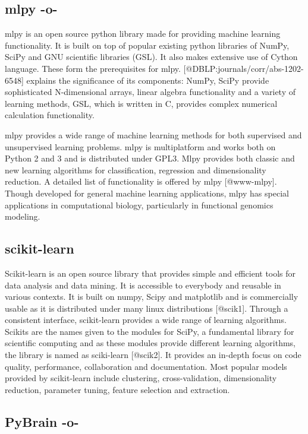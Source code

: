 \subsection{mlpy -o-}
    
mlpy is an open source python library made for providing machine
learning functionality. It is built on top of popular existing python
libraries of NumPy, SciPy and GNU scientific libraries (GSL). It also
makes extensive use of Cython language. These form the prerequisites
for mlpy. [@DBLP:journals/corr/abs-1202-6548] explains the
significance of its components: NumPy, SciPy provide sophisticated
N-dimensional arrays, linear algebra functionality and a variety of
learning methods, GSL, which is written in C, provides complex
numerical calculation functionality.

mlpy provides a wide range of machine learning methods for both
supervised and unsupervised learning problems. mlpy is multiplatform
and works both on Python 2 and 3 and is distributed under GPL3. Mlpy
provides both classic and new learning algorithms for classification,
regression and dimensionality reduction. A detailed list of
functionality is offered by mlpy [@www-mlpy]. Though developed for
general machine learning applications, mlpy has special applications
in computational biology, particularly in functional genomics
modeling.



\subsection{scikit-learn}

Scikit-learn is an open source library that provides simple and
efficient tools for data analysis and data mining. It is accessible to
everybody and reusable in various contexts. It is built on numpy,
Scipy and matplotlib and is commercially usable as it is distributed
under many linux distributions [@scik1]. Through a consistent
interface, scikit-learn provides a wide range of learning
algorithms. Scikits are the names given to the modules for SciPy, a
fundamental library for scientific computing and as these modules
provide different learning algorithms, the library is named as
sciki-learn [@scik2]. It provides an in-depth focus on code
quality, performance, collaboration and documentation. Most popular
models provided by scikit-learn include clustering, cross-validation,
dimensionality reduction, parameter tuning, feature selection and
extraction.

\subsection{PyBrain -o-}

